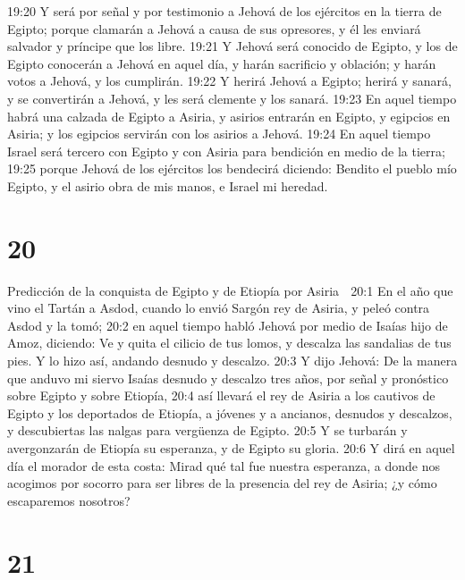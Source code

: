 19:20 Y será por señal y por testimonio a Jehová de los ejércitos en la tierra de Egipto; porque clamarán a Jehová a causa de sus opresores, y él les enviará salvador y príncipe que los libre.  
19:21 Y Jehová será conocido de Egipto, y los de Egipto conocerán a Jehová en aquel día, y harán sacrificio y oblación; y harán votos a Jehová, y los cumplirán.  
19:22 Y herirá Jehová a Egipto; herirá y sanará, y se convertirán a Jehová, y les será clemente y los sanará.  
19:23 En aquel tiempo habrá una calzada de Egipto a Asiria, y asirios entrarán en Egipto, y egipcios en Asiria; y los egipcios servirán con los asirios a Jehová.  
19:24 En aquel tiempo Israel será tercero con Egipto y con Asiria para bendición en medio de la tierra;  
19:25 porque Jehová de los ejércitos los bendecirá diciendo: Bendito el pueblo mío Egipto, y el asirio obra de mis manos, e Israel mi heredad. 
  

\chapter{20}

Predicción de la conquista de Egipto y de Etiopía por Asiria  

20:1 En el año que vino el Tartán a Asdod, cuando lo envió Sargón rey de Asiria, y peleó contra Asdod y la tomó;  
20:2 en aquel tiempo habló Jehová por medio de Isaías hijo de Amoz, diciendo: Ve y quita el cilicio de tus lomos, y descalza las sandalias de tus pies. Y lo hizo así, andando desnudo y descalzo.  
20:3 Y dijo Jehová: De la manera que anduvo mi siervo Isaías desnudo y descalzo tres años, por señal y pronóstico sobre Egipto y sobre Etiopía,  
20:4 así llevará el rey de Asiria a los cautivos de Egipto y los deportados de Etiopía, a jóvenes y a ancianos, desnudos y descalzos, y descubiertas las nalgas para vergüenza de Egipto.  
20:5 Y se turbarán y avergonzarán de Etiopía su esperanza, y de Egipto su gloria.  
20:6 Y dirá en aquel día el morador de esta costa: Mirad qué tal fue nuestra esperanza, a donde nos acogimos por socorro para ser libres de la presencia del rey de Asiria; ¿y cómo escaparemos nosotros?  

\chapter{21}

